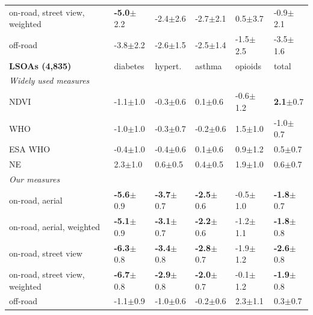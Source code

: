 \begin{table}[t!]
\begin{tabular}{l*{5}{l}}
\quad on-road, street view, weighted & \cellcolor{negcell}\textbf{-5.0}{\tiny$\pm$2.2} & -2.4{\tiny$\pm$2.6} & -2.7{\tiny$\pm$2.1} & \phantom{-}0.5{\tiny$\pm$3.7} & -0.9{\tiny$\pm$2.1} \\
\quad off-road & -3.8{\tiny$\pm$2.2} & -2.6{\tiny$\pm$1.5} & -2.5{\tiny$\pm$1.4} & -1.5{\tiny$\pm$2.5} & -3.5{\tiny$\pm$1.6} \\
\midrule[\heavyrulewidth]
\textbf{LSOAs (4,835)} & diabetes & hypert. & asthma & opioids & total \\
\midrule
\multicolumn{6}{l}{\emph{Widely used measures}} \\
\quad NDVI & -1.1{\tiny$\pm$1.0} & -0.3{\tiny$\pm$0.6} & \phantom{-}0.1{\tiny$\pm$0.6} & -0.6{\tiny$\pm$1.2} & \cellcolor{poscell}\textbf{\phantom{-}2.1}{\tiny$\pm$0.7} \\
\quad WHO & -1.0{\tiny$\pm$1.0} & -0.3{\tiny$\pm$0.7} & -0.2{\tiny$\pm$0.6} & \phantom{-}1.5{\tiny$\pm$1.0} & -1.0{\tiny$\pm$0.7} \\
\quad ESA WHO & -0.4{\tiny$\pm$1.0} & -0.4{\tiny$\pm$0.6} & \phantom{-}0.1{\tiny$\pm$0.6} & \phantom{-}0.9{\tiny$\pm$1.2} & \phantom{-}0.5{\tiny$\pm$0.7} \\
\quad NE & \phantom{-}2.3{\tiny$\pm$1.0} & \phantom{-}0.6{\tiny$\pm$0.5} & \phantom{-}0.4{\tiny$\pm$0.5} & \phantom{-}1.9{\tiny$\pm$1.0} & \phantom{-}0.6{\tiny$\pm$0.7} \\
\midrule
\multicolumn{6}{l}{\emph{Our measures}} \\
\quad on-road, aerial & \cellcolor{negcell}\textbf{-5.6}{\tiny$\pm$0.9} & \cellcolor{negcell}\textbf{-3.7}{\tiny$\pm$0.7} & \cellcolor{negcell}\textbf{-2.5}{\tiny$\pm$0.6} & -0.5{\tiny$\pm$1.0} & \cellcolor{negcell}\textbf{-1.8}{\tiny$\pm$0.7} \\
\quad on-road, aerial, weighted & \cellcolor{negcell}\textbf{-5.1}{\tiny$\pm$0.9} & \cellcolor{negcell}\textbf{-3.1}{\tiny$\pm$0.7} & \cellcolor{negcell}\textbf{-2.2}{\tiny$\pm$0.6} & -1.2{\tiny$\pm$1.1} & \cellcolor{negcell}\textbf{-1.8}{\tiny$\pm$0.8} \\
\quad on-road, street view & \cellcolor{negcell}\textbf{-6.3}{\tiny$\pm$0.8} & \cellcolor{negcell}\textbf{-3.4}{\tiny$\pm$0.8} & \cellcolor{negcell}\textbf{-2.8}{\tiny$\pm$0.7} & -1.9{\tiny$\pm$1.2} & \cellcolor{negcell}\textbf{-2.6}{\tiny$\pm$0.8} \\
\quad on-road, street view, weighted & \cellcolor{negcell}\textbf{-6.7}{\tiny$\pm$0.8} & \cellcolor{negcell}\textbf{-2.9}{\tiny$\pm$0.8} & \cellcolor{negcell}\textbf{-2.0}{\tiny$\pm$0.7} & -0.1{\tiny$\pm$1.2} & \cellcolor{negcell}\textbf{-1.9}{\tiny$\pm$0.8} \\
\quad off-road & -1.1{\tiny$\pm$0.9} & -1.0{\tiny$\pm$0.6} & -0.2{\tiny$\pm$0.6} & \phantom{-}2.3{\tiny$\pm$1.1} & \phantom{-}0.3{\tiny$\pm$0.7} \\
\bottomrule
\end{tabular}
\end{table}

